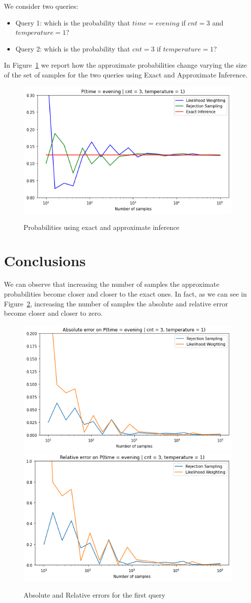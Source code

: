 \documentclass[letterpaper,11pt]{article}
\begin{document}
We consider two queries:
 \begin{itemize}
   \item Query 1: which is the probability that $time = evening$ if $cnt = 3$ and $
    temperature = 1$?
   \item Query 2: which is the probability that  $cnt = 3$ if $
   temperature = 1$?\\
 \end{itemize}
 In Figure~\ref{fig:prob} we report how the approximate probabilities change varying the size of the
  set of samples for the two queries using Exact and Approximate Inference.\\

\begin{figure}[h]
\centering
{\includegraphics[width=.45\textwidth]{q1.png}} 
 \\
\caption{Probabilities using exact and approximate inference}
\label{fig:prob}
\end{figure}

\section{Conclusions}
We can observe that increasing the number of samples the approximate probabilities
become closer and closer to the exact ones. In fact, as we can see in 
Figure~\ref{fig:error}, increasing the number of samples
the absolute and relative error become closer and closer to zero.

\begin{figure}[p]
  \centering
  {\includegraphics[width=.45\textwidth]{ab_err.png}} \quad
  {\includegraphics[width=.45\textwidth]{rel_err.png}} \\
  \caption{Absolute and Relative errors for the first query}
  \label{fig:error}
  \vspace{128in}
  \end{figure}
\end{document}
